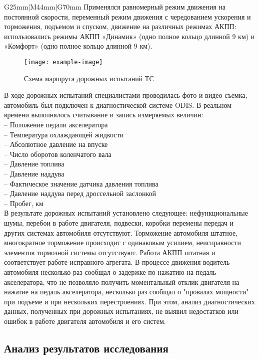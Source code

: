 {\begin{longtable}{G{25mm}|M{44mm}|G{70mm}}
 Применялся  равномерный режим движения на постоянной скорости, переменный режим движения с чередованием ускорения и торможения, подъемом и спуском,  движение на различных режимах АКПП: использовались  режимы АКПП «Динамик» (одно полное кольцо длинной 9 км) и «Комфорт» (одно полное кольцо длинной 9 км).
 
 \begin{figure}[H]
 	\centering
 	\texttt{[image: example-image]}
 	\caption{Схема маршрута дорожных испытаний ТС  }
 	\label{shemam}
 \end{figure}
 В ходе дорожных испытаний специалистами  проводилась фото и видео съемка,  автомобиль был подключен к диагностической системе ODIS. В реальном времени выполнялось считывание и запись измеряемых величин:\\
 -- Положение педали акселератора\\
 -- Температура охлаждающей жидкости\\
 -- Абсолютное давление на впуске\\
 -- Число оборотов коленчатого вала\\
 -- Давление топлива\\
 -- Давление наддува\\
 -- Фактическое значение датчика давления топлива\\
 -- Давление наддува перед дроссельной заслонкой\\
 -- Пробег, км\\
  
 В результате дорожных испытаний установлено следующее: нефункциональные шумы, перебои в работе двигателя, подвески, коробки перемены передач и других системах автомобиля отсутствуют.   Торможение автомобиля штатное, многократное торможение происходит с одинаковым усилием, неисправности элементов тормозной системы отсутствуют. Работа АКПП штатная и соответствует работе исправного агрегата. В процессе движения водитель автомобиля несколько раз сообщал о задержке  по нажатию на педаль акселератора, что  не  позволяло получить моментальный отклик двигателя на нажатие на педаль акселератора, несколько раз сообщал о "провалах  мощности" при подъеме и при нескольких перестроениях. При этом, анализ диагностических данных, полученных при дорожных испытаниях, не выявил недостатков или ошибок в работе двигателя автомобиля и его систем.  \\
 

\subsection{Анализ результатов исследования}


\end{longtable}}
